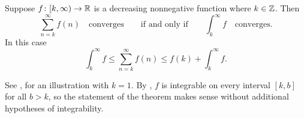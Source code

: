 \begin{prop}
Suppose $f \colon [k,\infty) \to {\mathbb{R}}$ is a decreasing nonnegative
function where $k \in {\mathbb{Z}}$.  Then
\begin{equation*}
\sum_{n=k}^\infty f(n)
\quad \text{converges} \qquad \text{if and only if}
\qquad
\int_k^\infty f
\quad \text{converges}.
\end{equation*}
In this case 
\begin{equation*}
\int_k^\infty f
\leq
\sum_{n=k}^\infty f(n)
\leq
f(k)+
\int_k^\infty f .
\end{equation*}
\end{prop}
See , for an illustration with $k=1$.
By ,
$f$ is integrable
on every interval $[k,b]$ for all $b > k$, so the statement of the theorem
makes sense without additional hypotheses of integrability.
\begin{myfigureht}
\caption{The area under the curve, 
$\int_1^\infty f$, is bounded below
by the area of the shaded rectangles,
$f(2)+f(3)+f(4)+\cdots$, and bounded above
by the area of the entire rectangles, both the shaded and unshaded parts,
$f(1)+f(2)+f(3)+\cdots$.\label{fig:integraltest}}
\end{myfigureht}

